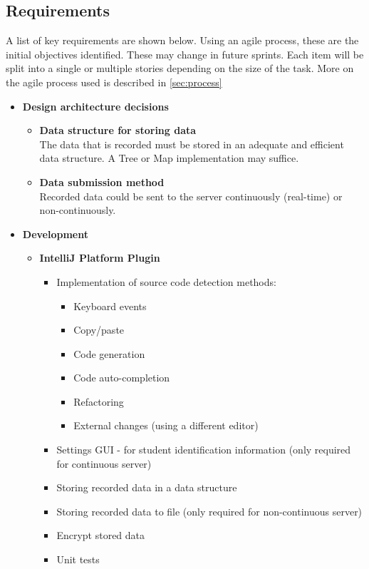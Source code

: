 \subsection{Requirements}
A list of key requirements are shown below. Using an agile process, these are the initial objectives identified. These may change in future sprints. Each item will be split into a single or multiple stories depending on the size of the task. More on the agile process used is described in \autoref{sec:process}

\begin{itemize}
  \item \textbf{Design architecture decisions}
  \begin{itemize}
    \item \textbf{Data structure for storing data}\\The data that is recorded must be stored in an adequate and efficient data structure. A Tree or Map implementation may suffice.
    \item \textbf{Data submission method}\\Recorded data could be sent to the server continuously (real-time) or non-continuously.
  \end{itemize}

  \item \textbf{Development}
  \begin{itemize}
    \item \textbf{IntelliJ Platform Plugin}
    \begin{itemize}
      \item Implementation of source code detection methods:
      \begin{itemize}
        \item Keyboard events
        \item Copy/paste
        \item Code generation
        \item Code auto-completion
        \item Refactoring
        \item External changes (using a different editor)
      \end{itemize}
      \item Settings GUI - for student identification information (only required for continuous server)
      \item Storing recorded data in a data structure 
      \item Storing recorded data to file (only required for non-continuous server)
      \item Encrypt stored data
      \item Unit tests
    \end{itemize}


\end{itemize}
\end{itemize}
